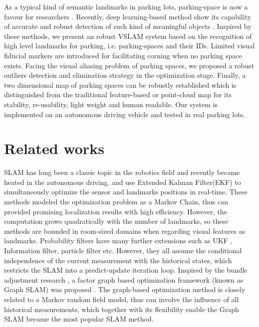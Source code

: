 \documentclass[journal]{IEEEtran}
\begin{document}
As a typical kind of semantic landmarks in parking lots, parking-space is now a favour for researchers
\citep{Houben:2015hq} \citep{Grimmett2015Integrating} \citep{Himstedt2017Online}.
Recently, deep learning-based method show its capability of  accurate and robust detection of such kind of meaningful objects \citep{zhanglin}. 
Inspired by these methods, we present an robust VSLAM system based on the recognition of high level landmarks for parking, i.e. parking-spaces and their IDs. 
Limited visual fiducial markers are introduced for facilitating corning when no parking space exists. 
Facing the visual aliasing problem of parking spaces, we proposed a robust outliers detection and elimination strategy in the optimization stage.
Finally, a two dimensional map of parking spaces can be robustly established which is distinguished from the traditional feature-based or point-cloud map for its stability, re-usability, light weight and human readable.
Our system is implemented on an autonomous driving vehicle and tested in real parking lots.

\section{Related works}
SLAM has long been a classic topic in the robotics field and recently became heated in the autonomous driving\citep{}. 
\citet{Davison2003Real} \citet{Davison2007MonoSLAM} and \citet{Civera20101} use Extended Kalman Filter(EKF) to simultaneously optimize the sensor and landmarks positions in real-time. 
These methods modeled the optimization problem as a Markov Chain, thus can provided promising localization results with high efficiency.
However, the computation grows quadratically with the number of landmarks\cite{Bailey2006Simultaneous}, so these methods are bounded in room-sized domains when regarding visual features as landmarks.
Probability filters have many further extensions such as UKF \citep{}, Information filter\citep{}, particle filter\citep{} etc.
However, they all assume the conditional independence of the current measurement with the historical states, which restricts the SLAM into a predict-update iteration loop.
Inspired by the bundle adjustment research \citep{}, a factor graph based optimization framework (known as Graph SLAM) was proposed \citep{}.
The graph-based optimization method is closely related to a Markov random field model, thus can involve the influence of all historical measurements, which together with its flexibility enable the Graph SLAM became the most popular SLAM method\citep{why filters}.  
\end{document}
